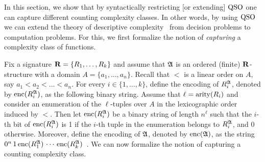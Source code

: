 
In this section, we show that by syntactically restricting [or extending] ${\rm QSO}$ one can capture different counting complexity classes. 
In other words, by using ${\rm QSO}$ we can extend the theory of descriptive complexity~\cite{immerman1999descriptive} from decision problems to computation problems. 
For this, we first formalize the notion of \emph{capturing} a complexity class of functions.

Fix a signature $\mathbf{R} = \{R_1, \ldots, R_k\}$ and assume that $\mathfrak{A}$ is an ordered (finite) $\mathbf{R}$-structure with a domain $A = \{a_1, \ldots, a_n\}$.
Recall that  $<$ is a linear order on $A$, say $a_1 < a_2 < \ldots < a_n$. For every $i \in \{1, \ldots, k\}$, define the encoding of $R_i^{\mathfrak{A}}$, denoted by ${\rm enc}(R_i^{\mathfrak{A}})$, as the following binary string. Assume that $\ell = {\rm arity}(R_i)$ and consider an enumeration of the $\ell$-tuples over $A$ in the lexicographic order induced by $<$. 
Then let ${\rm enc}(R_i^{\mathfrak{A}})$ be a binary string of length $n^\ell$ such that the $i$-th bit of ${\rm enc}(R_i^{\mathfrak{A}})$ is 1 if the $i$-th tuple in the enumeration belongs to $R_i^{\mathfrak{A}}$, and 0 otherwise. Moreover, define the encoding of $\mathfrak{A}$, denoted by ${\rm enc}(\mathfrak{A})$, as the string
$0^n \, 1 \, {\rm enc}(R_1^{\mathfrak{A}}) \, \cdots \, {\rm enc}(R_k^{\mathfrak{A}})$~\cite{L04}. 
We can now formalize the notion of capturing a counting complexity class. 
